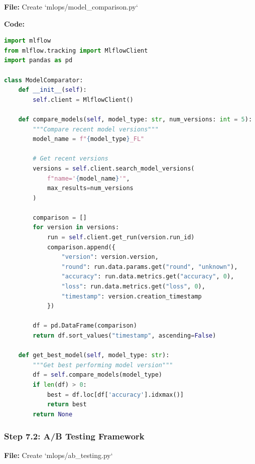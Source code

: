 \documentclass[12pt]{article}
\begin{document}
\textbf{File:} Create `mlops/model_comparison.py`

\textbf{Code:}
\begin{lstlisting}[language=Python]
import mlflow
from mlflow.tracking import MlflowClient
import pandas as pd

class ModelComparator:
    def __init__(self):
        self.client = MlflowClient()
    
    def compare_models(self, model_type: str, num_versions: int = 5):
        """Compare recent model versions"""
        model_name = f"{model_type}_FL"
        
        # Get recent versions
        versions = self.client.search_model_versions(
            f"name='{model_name}'",
            max_results=num_versions
        )
        
        comparison = []
        for version in versions:
            run = self.client.get_run(version.run_id)
            comparison.append({
                "version": version.version,
                "round": run.data.params.get("round", "unknown"),
                "accuracy": run.data.metrics.get("accuracy", 0),
                "loss": run.data.metrics.get("loss", 0),
                "timestamp": version.creation_timestamp
            })
        
        df = pd.DataFrame(comparison)
        return df.sort_values("timestamp", ascending=False)
    
    def get_best_model(self, model_type: str):
        """Get best performing model version"""
        df = self.compare_models(model_type)
        if len(df) > 0:
            best = df.loc[df['accuracy'].idxmax()]
            return best
        return None
\end{lstlisting}

\subsubsection{Step 7.2: A/B Testing Framework}

\textbf{File:} Create `mlops/ab_testing.py`
\end{document}
